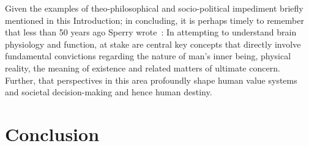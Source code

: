 \documentclass[10pt,letterpaper]{article}
\begin{document}
Given the examples of theo-philosophical and socio-political impediment briefly mentioned in this Introduction; in concluding, it is perhaps timely to remember that less than 50 years ago Sperry wrote~\cite{sperry80}: In attempting to understand brain physiology and function, at stake are central key concepts that directly involve fundamental convictions regarding the nature of man's inner being, physical reality, the meaning of existence and related matters of ultimate concern. Further, that perspectives in this area profoundly shape human value systems and societal decision-making and hence human destiny.

\section*{Conclusion}




\end{document}
